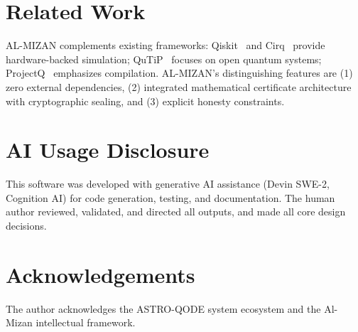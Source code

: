 \documentclass[preprint,12pt]{elsarticle}
\begin{document}
\section{Related Work}

AL-MIZAN complements existing frameworks: Qiskit~\cite{qiskit} and Cirq~\cite{cirq} provide hardware-backed simulation; QuTiP~\cite{qutip} focuses on open quantum systems; ProjectQ~\cite{projectq} emphasizes compilation. AL-MIZAN's distinguishing features are (1) zero external dependencies, (2) integrated mathematical certificate architecture with cryptographic sealing, and (3) explicit honesty constraints.

\section*{AI Usage Disclosure}

This software was developed with generative AI assistance (Devin SWE-2, Cognition AI) for code generation, testing, and documentation. The human author reviewed, validated, and directed all outputs, and made all core design decisions.

\section*{Acknowledgements}

The author acknowledges the ASTRO-Q\textdegree ODE system ecosystem and the Al-Mizan intellectual framework.



\end{document}
